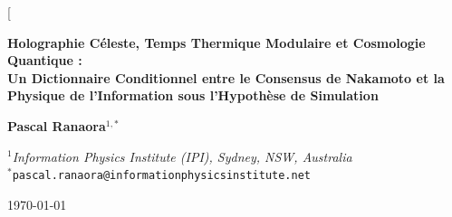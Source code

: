 \documentclass[10pt,twocolumn,a4paper]{article}
\theoremstyle{plain}
\theoremstyle{definition}
\theoremstyle{remark}
\begin{document}

\twocolumn[%
\begin{minipage}{\textwidth}
    \centering
    \vspace{-0.4cm}
    {\Large\bfseries Holographie Céleste, Temps Thermique Modulaire et Cosmologie Quantique :\\[0.2em]
    Un Dictionnaire Conditionnel entre le Consensus de Nakamoto et la Physique de l'Information sous l'Hypothèse de Simulation\par}
    \vspace{0.4cm}
    {\normalsize \textbf{Pascal Ranaora}$^{1,*}$ \quad \par}
    \vspace{0.15cm}
    {\small $^{1}$\textit{Information Physics Institute (IPI), Sydney, NSW, Australia}\\
    $^{*}$\texttt{pascal.ranaora@informationphysicsinstitute.net}\par}
    \vspace{0.15cm}
    {\small \today\par}
    \vspace{0.35cm}
    \begin{minipage}{0.92\textwidth}
        \small

\end{minipage}
\end{minipage}
\end{document}
